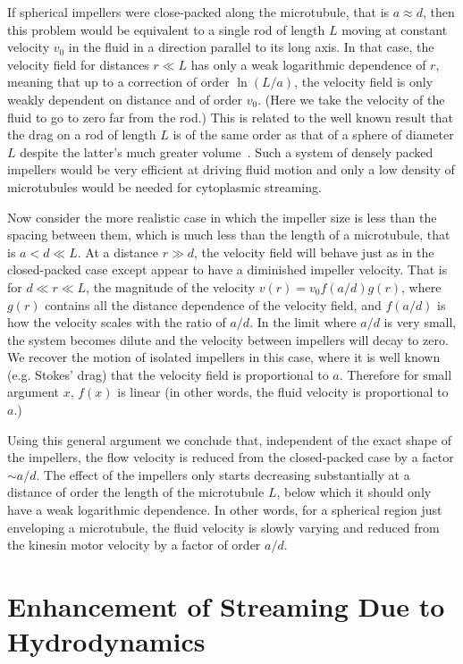 \documentclass[11pt]{ucthesis}
\begin{document}
If spherical impellers were close-packed along the microtubule, that is $a \approx
d$, then this problem would be equivalent to a single rod of length $L$
moving at constant velocity $v_0$ in the fluid in a direction parallel
to its long axis.  In that case, the velocity field for distances
$r \ll L$ has only a weak logarithmic dependence of $r$, meaning that up
to a correction of order $\ln(L/a)$, the velocity field is only weakly
dependent on distance and of order $v_0$. (Here we take the velocity of the fluid
to go to zero far from the rod.)
This is related to the well
known result that the drag on a rod of length $L$ is of the same order
as that of a sphere of diameter $L$ despite the latter's much greater volume~\cite{BergRandomWalksinBiology}. Such a system of densely packed impellers would
be very efficient at driving fluid motion and only a low density of microtubules
would be needed for cytoplasmic streaming.

Now consider the more realistic case in which the impeller size is less than
the spacing between them, which is much less than the length of a
microtubule, that is $a < d \ll L$.  At a distance $r \gg d$, the
velocity field will behave just as in the closed-packed case except appear
to have a diminished impeller velocity. That is for $d \ll r \ll L$,
the magnitude of the velocity $v(r)  = v_0 f(a/d) g(r)$, where $g(r)$
contains all the distance dependence of the velocity field, and $f(a/d)$
is how the velocity scales with the ratio of $a/d$. In the limit where
$a/d$ is very small, the system becomes dilute and the velocity between 
impellers will decay to zero. We recover the motion of isolated impellers
in this case, where it is well known (e.g. Stokes' drag) that the velocity
field is proportional to $a$. Therefore for small argument $x$, $f(x)$ is
linear (in other words, the fluid velocity is proportional to $a$.) 

Using this general argument we conclude that, independent of the exact shape of the impellers,
the flow velocity is reduced from the closed-packed case by a factor $\sim a/d$. The effect
of the impellers only starts decreasing substantially at a distance of order the
length of the microtubule $L$, below which it should only have a weak logarithmic
dependence. In other words, for a spherical region just enveloping a microtubule,
the fluid velocity is slowly varying and reduced from the kinesin motor velocity 
by a factor of order $a/d$.

\section{Enhancement of Streaming Due to Hydrodynamics} 
\end{document}
